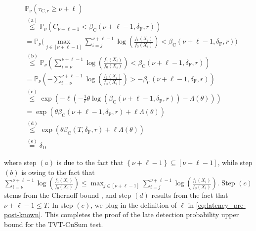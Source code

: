 \documentclass[12pt]{interact}
\newcommand{\aaaa}{\mathrm{(a)}}
\newcommand{\bbbb}{\mathrm{(b)}}
\newcommand{\cccc}{\mathrm{(c)}}
\newcommand{\dddd}{\mathrm{(d)}}
\newcommand{\eeee}{\mathrm{(e)}}
\newcommand{\lp}{\left(}
\newcommand{\rp}{\right)}
\newcommand{\lb}{\left[}
\newcommand{\rb}{\right]}
\newcommand{\lbp}{\left\{}
\newcommand{\rbp}{\right\}}
\newcommand{\mrm}{\mathrm}
\renewcommand{\Pr}{\mathbb{P}}
\theoremstyle{plain}
\begin{document}
\begin{align}
&\Pr_{\nu}\lp\tau_{\mrm{C}, r} \geq \nu+\ell\rp \nonumber \\ 
&\overset{\aaaa}{\leq}\Pr_{\nu}\lp C_{\nu+\ell-1}<\beta_{\mrm{C}}\lp \nu+\ell-1,\delta_{\mathrm{F}},r\rp\rp \nonumber\\
&=\Pr_{\nu}\Bigg(\max_{j \in \lb\nu+\ell-1\rb}\sum_{i=j}^{\nu+\ell-1}\log\lp\frac{f_{1}\lp X_{i}\rp}{f_{0}\lp X_{i}\rp}\rp<\beta_{\mrm{C}}\lp \nu+\ell-1,\delta_{\mathrm{F}},r\rp\Bigg)\nonumber\\
&\overset{\bbbb}{\leq}\Pr_{\nu}\lp\sum_{i=\nu}^{\nu+\ell-1}\log\lp\frac{f_{1}\lp X_{i}\rp}{f_{0}\lp X_{i}\rp}\rp<\beta_{\mrm{C}}\lp \nu+\ell-1,\delta_{\mathrm{F}},r\rp\rp\nonumber\\
&=\Pr_{\nu}\lp-\sum_{i=\nu}^{\nu+\ell-1}\log\lp\frac{f_{1}\lp X_{i}\rp}{f_{0}\lp X_{i}\rp}\rp>-\beta_{\mrm{C}}\lp \nu+\ell-1,\delta_{\mathrm{F}},r\rp\rp\nonumber\\
&\overset{\cccc}{\leq}\exp\lp-\ell\lp-\frac{1}{\ell}\theta\log\lp\beta_{\mrm{C}}\lp \nu+\ell-1,\delta_{\mathrm{F}},r\rp\rp-\Lambda\lp\theta\rp\rp\rp\nonumber\\
&=\exp\lp\theta\beta_{\mrm{C}}\lp \nu+\ell-1,\delta_{\mathrm{F}},r\rp+ \ell\Lambda\lp\theta\rp\rp\nonumber \\
&\overset{\dddd}{\leq}\exp\lp\theta\beta_{\mrm{C}}\lp T,\delta_{\mathrm{F}},r\rp+ \ell\Lambda\lp\theta\rp\rp\nonumber \\
&\overset{\eeee}{=}\delta_{\mrm{D}}\label{eq:TVT-CuSum_LD_2}
\end{align}

%
where step $(a)$ is due to the fact that $\lbp \nu+\ell-1\rbp\subseteq\lb \nu+\ell-1\rb$, while step $(b)$ is owing to the fact that $\sum_{i=\nu}^{\nu+\ell-1}\log\lp\frac{f_{1}\lp X_{i}\rp}{f_{0}\lp X_{i}\rp}\rp\leq\max_{j \in \lb\nu+\ell-1\rb}\sum_{i=j}^{\nu+\ell-1}\log\lp\frac{f_{1}\lp X_{i}\rp}{f_{0}\lp X_{i}\rp}\rp$. Step $(c)$ stems from the Chernoff bound \citep{chernoff1952measure}, and step $(d)$ results from the fact that $\nu+\ell-1\leq T$. In step $(e)$, we plug in the definition of $\ell$ in \eqref{eq:latency_pre-post-known}. This completes the proof of the late detection probability upper bound for the TVT-CuSum test.
\end{document}
